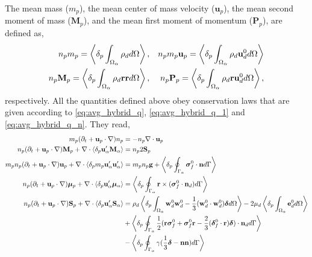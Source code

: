 The mean mass ($m_p$), the mean center of mass velocity ($\textbf{u}_p$), the mean second moment of mass ($\textbf{M}_p$), and the mean first moment of momentum ($\textbf{P}_p$), are defined as,
\begin{align}
    n_p m_p 
    =
    \left<\delta_{p} \int_{\Omega_{\alpha}} \rho_d d\Omega\right>,
    && n_p m_p \textbf{u}_p  
    =
    \left<\delta_{p} \int_{\Omega_{\alpha}} \rho_d \textbf{u}_d^0 d\Omega\right>\\
    n_p \textbf{M}_p  
    =
    \left<\delta_{p} \int_{\Omega_{\alpha}} \rho_d \textbf{rr}  d\Omega\right>,
    && n_p \textbf{P}_p  
    =
    \left<\delta_{p} \int_{\Omega_{\alpha}} \rho_d \textbf{r} \textbf{u}_d^0 d\Omega\right>,
\end{align} 
respectively. 
All the quantities defined above obey conservation laws that are given according to \ref{eq:avg_hybrid_q}, \ref{eq:avg_hybrid_q_1} and \ref{eq:avg_hybrid_q_n}.
They read, 
\begin{align}
    m_p(\pddt + \textbf{u}_p \cdot \grad)n_p
    &=
    - n_p \div \textbf{u}_p\\
    n_p (\pddt + \textbf{u}_p \cdot \grad) \textbf{M}_p
    +\div  \pavg{\textbf{u}_\alpha'\textbf{M}_\alpha}
    &=
    n_p2  \textbf{S}_p
    \label{eq:dt_hybrid_Mp}\\
    \label{eq:dt_hybrid_up}
    m_p n_p(\pddt + \textbf{u}_p \cdot \grad)\textbf{u}_p
    + \div \pavg{m_p \textbf{u}_\alpha'\textbf{u}_\alpha'}
    &=
    m_p n_p \textbf{g}
    + \pSavg{\bm\sigma_f^0 \cdot \textbf{n}}\\
    \label{eq:dt_hybrid_mup}
    n_p (\pddt + \textbf{u}_p \cdot \grad) \bm{\mu}_p
    +\div  \pavg{\textbf{u}_\alpha'\bm\mu_\alpha}
    &=
    \pSavg{\textbf{r}\times(\bm\sigma_f^0\cdot \textbf{n}_d)}
    \\
    \label{eq:dt_hybrid_Sp}
    n_p (\pddt + \textbf{u}_p \cdot \grad) \textbf{S}_p
    +\div  \pavg{\textbf{u}_\alpha'\textbf{S}_\alpha}
    &=
    \rho_d \pOavg{
        \textbf{w}_d^0  \textbf{w}_d^0 
        -\frac{1}{3} (\textbf{w}_d^0 \cdot  \textbf{w}_d^0) \bm\delta
    }
    -2 \mu_d \pOavg{\textbf{e}_d^0} \nonumber \\
    &+\pSavg{\frac{1}{2}(\textbf{r}\bm\sigma_f^0+\bm\sigma_f^0\textbf{r}-\frac{2}{3}(\bm\delta_f^0 \cdot \textbf{r})\bm\delta)\cdot \textbf{n}_d}\nonumber\\
    &-  \pSavg{\gamma (\frac{1}{3}\bm\delta - \textbf{nn})}
\end{align}
